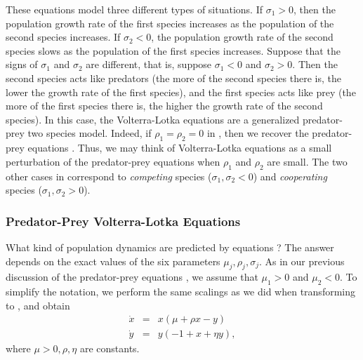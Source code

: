 These equations model three different types of situations.  If
$\sigma_1>0$, then the population growth rate of the first species 
increases as the population of the second species increases.  If
$\sigma_2<0$, the population growth rate of the second species
slows as the population of the first species increases.
Suppose that the signs of $\sigma_1$ and $\sigma_2$ are
different, that is, suppose $\sigma_1<0$ and $\sigma_2>0$.  Then
the second species acts like predators (the more of the second
species there is, the lower the growth rate of the first
species), and the first species acts like prey (the more of
the first species there is, the higher the growth rate of the
second species).  In this case, the Volterra-Lotka equations are
a generalized predator-prey two species model.  Indeed,
if $\rho_1=\rho_2=0$ in , then we recover the
predator-prey equations .  Thus, we may think of
Volterra-Lotka equations as a small perturbation of the 
predator-prey equations when $\rho_1$ and $\rho_2$ are small.
The two other cases in  correspond to {\em competing\/} 
species ($\sigma_1,\sigma_2<0$) and 
{\em cooperating\/} species
($\sigma_1,\sigma_2>0$).


\subsubsection*{Predator-Prey Volterra-Lotka Equations}

What kind of population dynamics are predicted by equations
?  The answer depends on the exact values of the 
six parameters $\mu_j,\rho_j,\sigma_j$.  As in our previous
discussion of the predator-prey equations , we assume
that $\mu_1>0$ and $\mu_2<0$.  To simplify the notation, we
perform the same scalings as we did when transforming  
to , and obtain
\begin{eqnarray*} 
\dot{x} & = & x(\mu + \rho x -       y) \\
\dot{y} & = & y( -1 +       x + \eta y),
\end{eqnarray*}
where $\mu>0,\rho,\eta$ are constants.  

